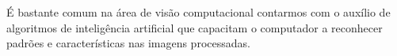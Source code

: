 É bastante comum na área de visão computacional contarmos com o auxílio de algoritmos de inteligência artificial que capacitam o computador a reconhecer padrões e características nas imagens processadas.